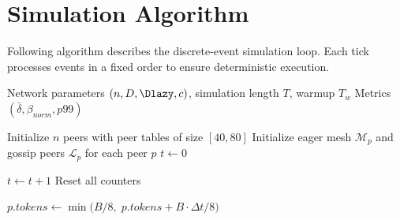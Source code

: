 \documentclass{article}
\begin{document}
\section{Simulation Algorithm}


Following algorithm describes the discrete-event simulation loop.
Each tick processes events in a fixed order to ensure deterministic execution.

\begin{algorithm}[H]
\caption{Gossipsub Simulation Main Loop}
\label{alg:simulation}
\begin{algorithmic}[1]
\Require Network parameters $(n, D, \Dlazy, c)$, simulation length $T$, warmup $T_w$
\Ensure Metrics $(\bar{\delta}, \beta_{\mathit{norm}}, \mathit{p99})$

\State Initialize $n$ peers with peer tables of size $[40, 80]$
\State Initialize eager mesh $\mathcal{M}_p$ and gossip peers $\mathcal{L}_p$ for each peer $p$
\State $t \gets 0$

    \State {} 
    \State {} 
    \State {} 
    \State {} 
    \State {} 
     
        \State {} 
        \State {} 
    \EndIf
    \State $t \gets t + 1$
        \State Reset all counters 
    \EndIf
\EndWhile

\State \Return {}
\end{algorithmic}
\end{algorithm}

\begin{algorithm}[H]
\caption{Token Bucket Refill}
\label{alg:refill}
\begin{algorithmic}[1]
    \State $p.\mathit{tokens} \gets \min\bigl(B/8, \; p.\mathit{tokens} + B \cdot \Delta t / 8\bigr)$
\EndFor
\EndProcedure
\end{algorithmic}
\end{algorithm}


\end{document}
